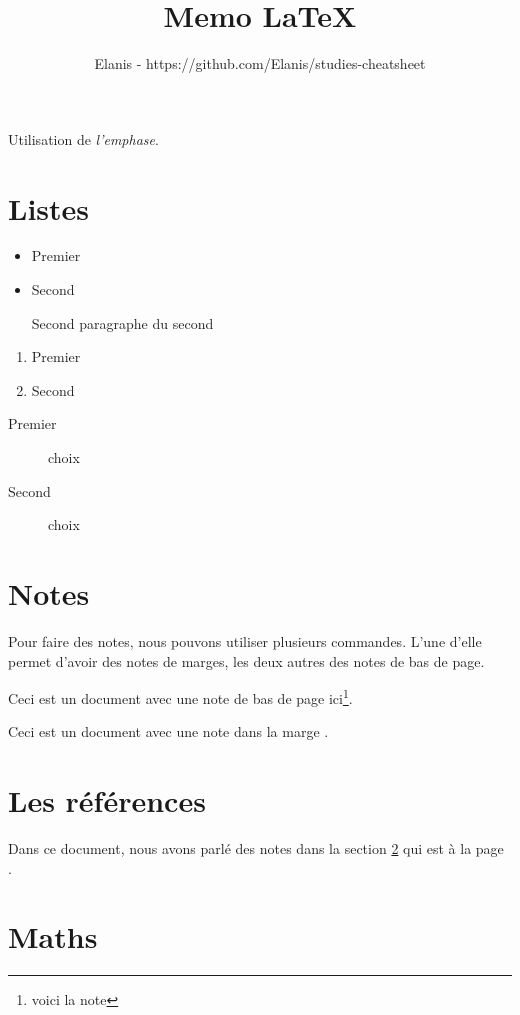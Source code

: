 \documentclass[a4paper, 12pt, french]{article}
\title{Memo LaTeX}
\author{Elanis - https://github.com/Elanis/studies-cheatsheet}
\begin{document}
	\maketitle

	Utilisation de \emph{l'emphase}.

	\section{Listes}

	\begin{itemize}
		\item Premier
		\item Second

		Second paragraphe du second
	\end{itemize}

	\begin{enumerate}
		\item Premier
		\item Second
	\end{enumerate}

	\begin{description}
		\item[Premier] choix
		\item[Second] choix
	\end{description}

	\section{Notes}
	\label{sec:notes}

	Pour faire des notes, nous pouvons utiliser plusieurs commandes. L’une d’elle permet 
	d’avoir des notes de marges, les deux autres des notes de bas de page.

	Ceci est un document avec une note de bas de page ici\footnote{voici la note}.

	Ceci est un document avec une note dans la marge .

	\section{Les références}
	Dans ce document, nous avons parlé des notes dans la section \ref{sec:notes} qui est à 
	la page \pageref{sec:notes}.

	\section{Maths}
\end{document}
